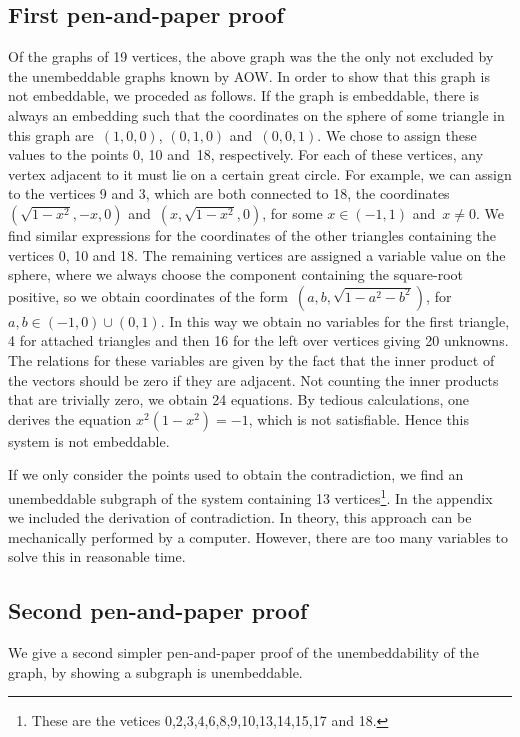 \documentclass{report}
\begin{document}
\subsection{First pen-and-paper proof}
Of the graphs of 19 vertices,
the above graph was the
the only not excluded by the unembeddable graphs
known by AOW.
In order to show that this graph is not embeddable,
we proceded as follows.
If the graph is embeddable, there is always an embedding such that
the coordinates on the sphere of some triangle in this graph
are~$(1,0,0)$, $(0,1,0)$ and~$(0,0,1)$.
We chose to assign these values
to the points 0, 10 and~18, respectively. For each of these vertices,
any vertex adjacent to it
must lie on a certain great circle.
For example, we can assign to the vertices 9 and 3, which
are both connected to 18, the coordinates~$(\sqrt{1-x^{2}}, -x,0)$
and~$(x,\sqrt{1-x^{2}},0)$, for some $x\in(-1,1)$ and~$x\neq 0$.
We find similar
expressions for the coordinates of the other triangles containing the
vertices 0, 10 and 18. The remaining vertices are assigned a variable
value on the sphere, where we always choose the component containing
the square-root positive, so we obtain coordinates of the
form~$(a,b,\sqrt{1-a^2-b^2})$, for $a,b \in (-1,0)\cup (0,1)$.
In this way we
obtain no variables for the first triangle, 4 for attached triangles
and then 16 for the left over vertices giving 20 unknowns. The
relations for these variables are given by the fact that the inner
product of the vectors should be zero if they are adjacent. Not
counting the inner products that are trivially zero, we obtain 24
equations. By tedious calculations, one
derives the equation $x^2(1-x^2) = -1$, which is not satisfiable.
Hence this system is not embeddable.

If we only consider the points used to obtain the
contradiction, we find an unembeddable subgraph of the system
containing 13 vertices\footnote{These are the vetices
0,2,3,4,6,8,9,10,13,14,15,17 and 18.}.
In the appendix we included the  derivation of contradiction.
In theory, this approach can be mechanically performed by
a computer.  However, there are too many variables
to solve this in reasonable time.

\subsection{Second pen-and-paper proof}
We give a second simpler pen-and-paper proof of the unembeddability
of the graph, by showing a subgraph is unembeddable.
\end{document}
